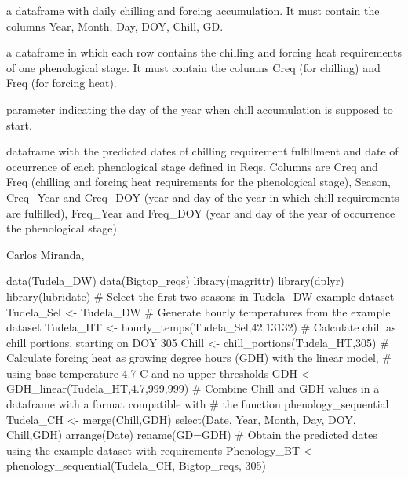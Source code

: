 \documentclass[a4paper]{book}
\begin{document}
\begin{Arguments}
\begin{ldescription}
\item[\code{GDH\_day}] a dataframe with daily chilling and forcing accumulation.
It must contain the columns Year, Month, Day, DOY, Chill, GD.

\item[\code{Reqs}] a dataframe in which each row contains the chilling and forcing
heat requirements of one phenological stage. It must contain the columns 
Creq (for chilling) and Freq (for forcing heat).

\item[\code{Start\_chill}] parameter indicating the day of the year when chill
accumulation is supposed to start.
\end{ldescription}
\end{Arguments}
%
\begin{Value}
dataframe with the predicted dates of chilling requirement fulfillment
and date of occurrence of each phenological stage defined in Reqs. Columns are
Creq and Freq (chilling and forcing heat requirements for the phenological stage),
Season, Creq\_Year and Creq\_DOY (year and day of the year in which chill 
requirements are fulfilled), Freq\_Year and Freq\_DOY (year and day of the year
of occurrence the phenological stage).
\end{Value}
%
\begin{Author}\relax
Carlos Miranda, 
\end{Author}
%
\begin{Examples}
\begin{ExampleCode}
data(Tudela_DW)
data(Bigtop_reqs)
library(magrittr)
library(dplyr)
library(lubridate)
# Select the first two seasons in Tudela_DW example dataset
Tudela_Sel <- Tudela_DW %
# Generate hourly temperatures from the example dataset
Tudela_HT <- hourly_temps(Tudela_Sel,42.13132)
# Calculate chill as chill portions, starting on DOY 305
Chill <- chill_portions(Tudela_HT,305)
# Calculate forcing heat as growing degree hours (GDH) with the linear model,
# using base temperature 4.7 C and no upper thresholds
GDH <- GDH_linear(Tudela_HT,4.7,999,999)
# Combine Chill and GDH values in a dataframe with a format compatible with
# the function phenology_sequential
Tudela_CH <- merge(Chill,GDH) %
  select(Date, Year, Month, Day, DOY, Chill,GDH) %
    arrange(Date) %
    rename(GD=GDH)
# Obtain the predicted dates using the example dataset with requirements
Phenology_BT <- phenology_sequential(Tudela_CH, Bigtop_reqs, 305)

\end{ExampleCode}
\end{Examples}
\end{document}
